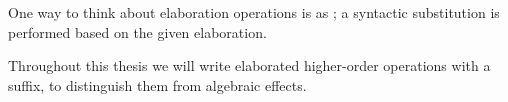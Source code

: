 One way to think about elaboration operations is as ; a syntactic substitution is performed based on the given elaboration.

Throughout this thesis we will write elaborated higher-order operations with a \code{!} suffix, to distinguish them from algebraic effects.

